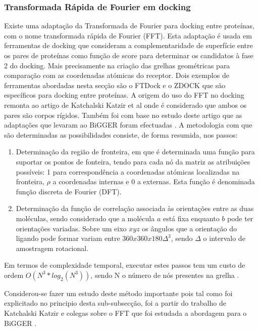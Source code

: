 \subsubsection{Transformada Rápida de Fourier em docking}
\label{fft}
Existe uma adaptação da Transformada de Fourier para docking entre proteínas, com o nome transformada rápida de Fourier (FFT). Esta adaptação é usada em ferramentas de docking que consideram a complementaridade de superfície entre os pares de proteínas como função de score para determinar os candidatos à fase 2 do docking. Mais precisamente na criação das grelhas geométricas para comparação com as coordenadas atómicas do receptor. Dois exemplos de ferramentas abordadas nesta secção são o FTDock e o ZDOCK que são específicos para docking entre proteínas.
A origem do uso do FFT no docking remonta ao artigo de Katchalski Katzir et al \cite{katchalski1992} onde é considerado que ambos os pares são corpos rígidos. Também foi com base no estudo deste artigo que as adaptações que levaram ao BiGGER foram efectuadas \cite{biggerPaper}.
 A metodologia com que são determinadas as possibilidades consiste, de forma resumida, nos passos:
\begin{enumerate}
	\item Determinação da região de fronteira, em que é determinada uma função para suportar os pontos de fonteira, tendo para cada nó da matriz as atribuições possíveis: 1  para correspondência a coordenadas atómicas localizadas na fronteira, $\rho$ a coordenadas internas e 0 a externas. Esta função é denominada função discreta de Fourier (DFT).
	
	\item Determinação da função de correlação associada às orientações entre as duas moléculas, sendo considerado que a molécula $a$ está fixa enquanto $b$ pode ter orientações variadas. Sobre um eixo $xyz$ os ângulos que a orientação do ligando pode formar variam entre $360x360x180\Delta^{3}$, sendo $\Delta$ o intervalo de amostragem rotacional.

\end{enumerate} 
Em termos de complexidade temporal, executar estes passos tem um custo de ordem $O(N^{3}*log_2(N^{3}))$, sendo N o número de nós presentes na grelha \cite{teseProf}.

Considerou-se fazer um estudo deste método importante pois tal como foi explicitado no principio desta sub-subsecção, foi a partir do trabalho de Katchalski Katzir e colegas sobre o FFT que foi estudada a abordagem para o BiGGER \cite{teseProf}. 

